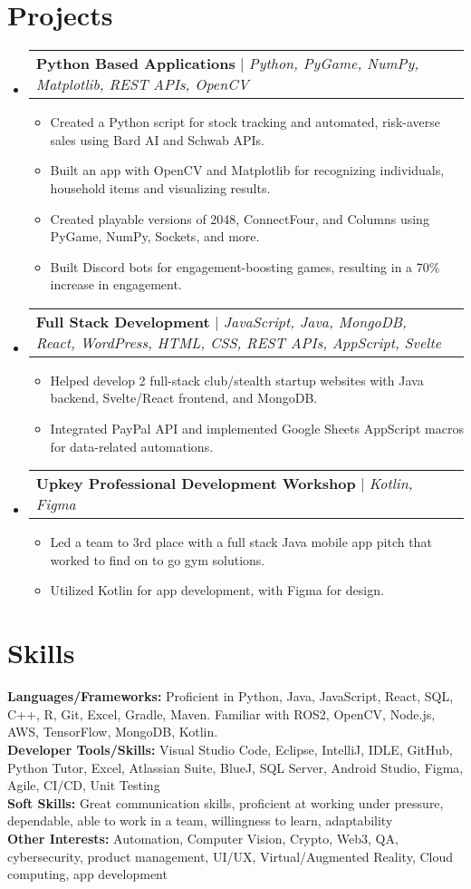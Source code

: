\documentclass[letterpaper,11pt]{article}
\makeatletter
\newcommand{\resumeItem}[1]{
  \item\small{
    {#1 \vspace{-2pt}}
  }
}
\newcommand{\resumeProjectHeading}[2]{
    \item
    \begin{tabular*}{0.97\textwidth}{l@{\extracolsep{\fill}}r}
      \small#1 & #2 \\
    \end{tabular*}\vspace{-7pt}
}
\newcommand{\resumeSubHeadingListStart}{\begin{itemize}[leftmargin=0.15in, label={}]}
\newcommand{\resumeSubHeadingListEnd}{\end{itemize}}
\newcommand{\resumeItemListStart}{\begin{itemize}}
\newcommand{\resumeItemListEnd}{\end{itemize}\vspace{-5pt}}
\makeatother
\begin{document}
\section{Projects}
\resumeSubHeadingListStart
\resumeProjectHeading
      {\textbf{Python Based Applications} $|$ \emph{Python, PyGame, NumPy, Matplotlib, REST APIs, OpenCV}}{}
        \resumeItemListStart
          \resumeItem{Created a Python script for stock tracking and automated, risk-averse sales using Bard AI and Schwab APIs.}
          \resumeItem{Built an app with OpenCV and Matplotlib for recognizing individuals, household items and visualizing results.}
          \resumeItem{Created playable versions of 2048, ConnectFour, and Columns using PyGame, NumPy, Sockets, and more.}
          \resumeItem{Built Discord bots for engagement-boosting games, resulting in a 70\% increase in engagement.}
        \resumeItemListEnd
      \resumeProjectHeading
          {\textbf{Full Stack Development} $|$ \emph{JavaScript, Java, MongoDB, React, WordPress, HTML, CSS, REST APIs, AppScript, Svelte}}{}
          \resumeItemListStart
            \resumeItem{Helped develop 2 full-stack club/stealth startup websites with Java backend, Svelte/React frontend, and MongoDB.}
            \resumeItem{Integrated PayPal API and implemented Google Sheets AppScript macros for data-related automations.}
          \resumeItemListEnd
      \resumeProjectHeading
          {\textbf{Upkey Professional Development Workshop} $|$ \emph{Kotlin, Figma}}{}
          \resumeItemListStart
          \resumeItem{Led a team to 3rd place with a full stack Java mobile app pitch that worked to find on to go gym solutions.}
          \resumeItem{Utilized Kotlin for app development, with Figma for design.}
          \resumeItemListEnd

\resumeSubHeadingListEnd



%
\section{Skills}
 \begin{itemize}[leftmargin=0.15in, label={}]
    \small{\item{
     \textbf{Languages/Frameworks: }{Proficient in Python, Java, JavaScript, React, SQL, C++, R, Git, Excel, Gradle, Maven. Familiar with ROS2, OpenCV, Node.js, AWS, TensorFlow, MongoDB, Kotlin.
     } \\
     \textbf{Developer Tools/Skills: }{Visual Studio Code, Eclipse, IntelliJ, IDLE, GitHub, Python Tutor, Excel, Atlassian Suite, BlueJ, SQL Server, Android Studio, Figma, Agile, CI/CD, Unit Testing} \\
     \textbf{Soft Skills: }{Great communication skills, proficient at working under pressure, dependable, able to work in a team, willingness to learn, adaptability}\\
     \textbf{Other Interests: }{Automation, Computer Vision, Crypto, Web3, QA, cybersecurity, product management, UI/UX, Virtual/Augmented Reality, Cloud computing, app development}
    }}
 \end{itemize}


\end{document}

